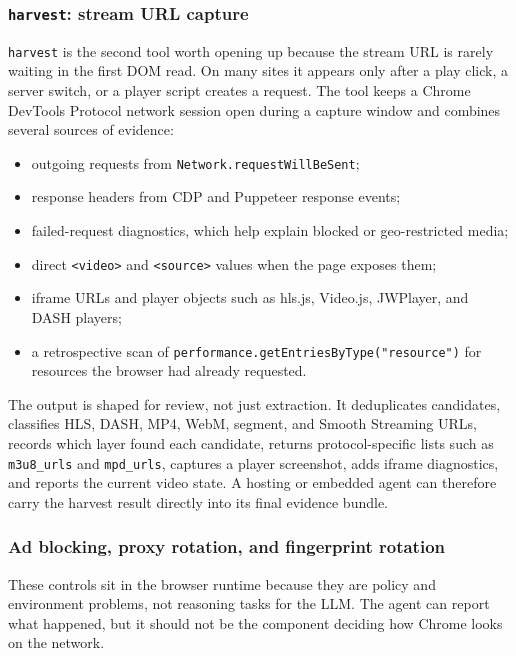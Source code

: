 \subsubsection{\texttt{harvest}: stream URL capture}

\texttt{harvest} is the second tool worth opening up because the stream URL is rarely
waiting in the first DOM read. On many sites it appears only after a play click, a server
switch, or a player script creates a request. The tool keeps a Chrome DevTools Protocol
network session open during a capture window and combines several sources of evidence:
\begin{itemize}
  \item outgoing requests from \texttt{Network.requestWillBeSent};
  \item response headers from CDP and Puppeteer response events;
  \item failed-request diagnostics, which help explain blocked or geo-restricted media;
  \item direct \texttt{<video>} and \texttt{<source>} values when the page exposes them;
  \item iframe URLs and player objects such as hls.js, Video.js, JWPlayer, and DASH
  players;
  \item a retrospective scan of \texttt{performance.getEntriesByType("resource")} for
  resources the browser had already requested.
\end{itemize}

The output is shaped for review, not just extraction. It deduplicates candidates,
classifies HLS, DASH, MP4, WebM, segment, and Smooth Streaming URLs, records which layer
found each candidate, returns protocol-specific lists such as \texttt{m3u8\_urls} and
\texttt{mpd\_urls}, captures a player screenshot, adds iframe diagnostics, and reports
the current video state. A hosting or embedded agent can therefore carry the harvest
result directly into its final evidence bundle.

\subsubsection{Ad blocking, proxy rotation, and fingerprint rotation}

These controls sit in the browser runtime because they are policy and environment
problems, not reasoning tasks for the LLM. The agent can report what happened, but it
should not be the component deciding how Chrome looks on the network.

